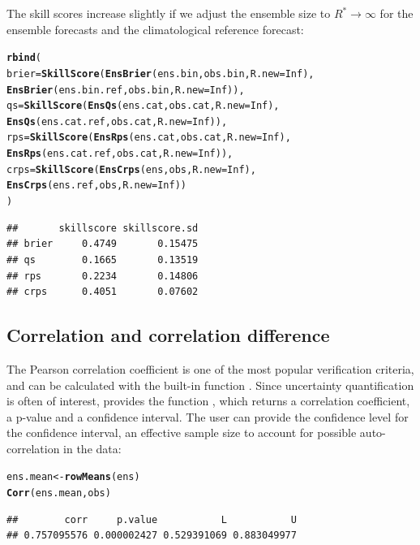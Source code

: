 \documentclass[article]{jss}\usepackage{graphicx, color}
\makeatletter
\newcommand{\hlfunctioncall}[1]{\textcolor[rgb]{0,0.501960784313725,0.752941176470588}{\textbf{#1}}}%
\newenvironment{kframe}{%
 \def\at@end@of@kframe{}%
 \ifinner\ifhmode%
  \def\at@end@of@kframe{\end{minipage}}%
  \begin{minipage}{\columnwidth}%
 \fi\fi%
 \def\FrameCommand##1{\hskip\@totalleftmargin \hskip-\fboxsep
 \colorbox{shadecolor}{##1}\hskip-\fboxsep
     \hskip-\linewidth \hskip-\@totalleftmargin \hskip\columnwidth}%
 \MakeFramed {\advance\hsize-\width
   \@totalleftmargin\z@ \linewidth\hsize
   \@setminipage}}%
 {\par\unskip\endMakeFramed%
 \at@end@of@kframe}
\newenvironment{knitrout}{}{} %
\makeatother
\begin{document}
The skill scores increase slightly if we adjust the ensemble size to $R^* \to \infty$ for the ensemble forecasts and the climatological reference forecast:

\begin{knitrout}
\color{fgcolor}\begin{kframe}
\begin{alltt}
\hlfunctioncall{rbind}(
  brier = \hlfunctioncall{SkillScore}(\hlfunctioncall{EnsBrier}(ens.bin, obs.bin, R.new=Inf), 
                     \hlfunctioncall{EnsBrier}(ens.bin.ref, obs.bin, R.new=Inf)),
  qs    = \hlfunctioncall{SkillScore}(\hlfunctioncall{EnsQs}(ens.cat, obs.cat, R.new=Inf), 
                     \hlfunctioncall{EnsQs}(ens.cat.ref, obs.cat, R.new=Inf)),
  rps   = \hlfunctioncall{SkillScore}(\hlfunctioncall{EnsRps}(ens.cat, obs.cat, R.new=Inf), 
                     \hlfunctioncall{EnsRps}(ens.cat.ref, obs.cat, R.new=Inf)),
  crps  = \hlfunctioncall{SkillScore}(\hlfunctioncall{EnsCrps}(ens, obs, R.new=Inf), 
                     \hlfunctioncall{EnsCrps}(ens.ref, obs, R.new=Inf))
)
\end{alltt}
\begin{verbatim}
##       skillscore skillscore.sd
## brier     0.4749       0.15475
## qs        0.1665       0.13519
## rps       0.2234       0.14806
## crps      0.4051       0.07602
\end{verbatim}
\end{kframe}
\end{knitrout}



\subsection{Correlation and correlation difference}

The Pearson correlation coefficient is one of the most popular verification criteria, and can be calculated with the built-in  function .
Since uncertainty quantification is often of interest,  provides the function , which returns a correlation coefficient, a p-value and a confidence interval.
The user can provide the confidence level for the confidence interval, an effective sample size to account for possible auto-correlation in the data:

\begin{knitrout}
\color{fgcolor}\begin{kframe}
\begin{alltt}
ens.mean <- \hlfunctioncall{rowMeans}(ens)
\hlfunctioncall{Corr}(ens.mean, obs)
\end{alltt}
\begin{verbatim}
##        corr     p.value           L           U 
## 0.757095576 0.000002427 0.529391069 0.883049977
\end{verbatim}
\end{kframe}
\end{knitrout}
\end{document}
